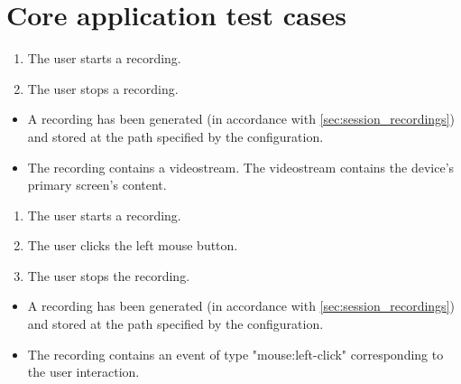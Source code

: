 \section{Core application test cases}

\begin{tests}
    {\begin{enumerate}
        \item The \gls{user} starts a recording.
        \item The \gls{user} stops a recording.
    \end{enumerate}}
    {\begin{itemize}
        \item A recording has been generated (in accordance with \ref{sec:session_recordings}) and stored at the path specified by the configuration.
        \item The recording contains a videostream. The videostream contains the \gls{device}'s primary screen's content.
    \end{itemize}}

    {\begin{enumerate}
        \item The \gls{user} starts a recording.
        \item The \gls{user} clicks the left mouse button.
        \item The \gls{user} stops the recording.
    \end{enumerate}}
    {\begin{itemize}
        \item A recording has been generated (in accordance with \ref{sec:session_recordings}) and stored at the path specified by the configuration.
        \item The recording contains an \gls{event} of type "mouse:left-click" corresponding to the user interaction.
    \end{itemize}}


\end{tests}
